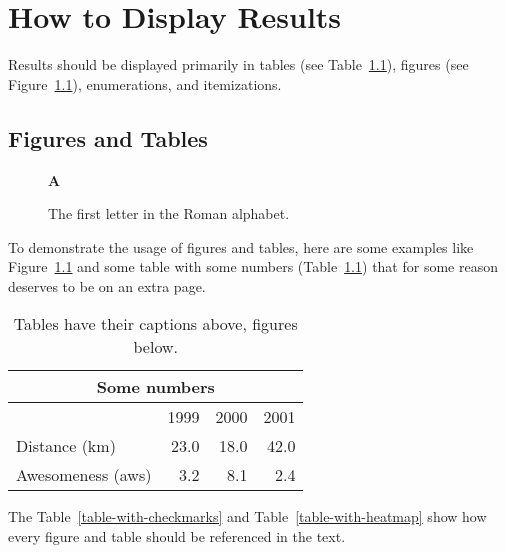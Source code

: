 \chapter{How to Display Results} \label{displaying-results}

Results should be displayed primarily in tables (see Table~\ref{table-with-numbers}), figures (see Figure~\ref{a-as-figure}), enumerations, and itemizations. 

\section{Figures and Tables}

\begin{figure}[tb]%
  \begin{center}
    {\huge\bf A}
  \end{center}
  \caption{The first letter in the Roman alphabet.}
  \label{a-as-figure} %
\end{figure}

To demonstrate the usage of figures and tables, here are some examples like Figure~\ref{a-as-figure} %
and some table with some numbers (Table~\ref{table-with-numbers}) that for some reason deserves to be on an extra page. 

\begin{table}[p]%
  \caption{Tables have their captions above, figures below.}
  \label{table-with-numbers}%
  \centering\small
  \begin{tabular}{@{}lrrr@{}} %
    \toprule
    \multicolumn{4}{c}{\bfseries Some numbers}\\
    \midrule
                      &   1999 & 2000 & 2001 \\
    \cmidrule(l){2-4} %
    Distance (km)     &   23.0 & 18.0 & 42.0 \\
    Awesomeness (aws) &    3.2 &  8.1 &  2.4 \\
    \bottomrule
  \end{tabular}
\end{table}
%
The Table~\ref{table-with-checkmarks} and Table~\ref{table-with-heatmap} show how every figure and table should be referenced in the text. 


